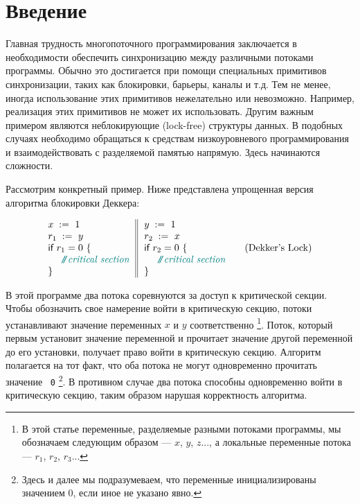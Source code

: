 \section{Введение}
\label{sec:intro}

Главная трудность многопоточного программирования 
заключается в необходимости обеспечить  
синхронизацию между различными потоками программы. 
Обычно это достигается при помощи специальных 
примитивов синхронизации, 
таких как блокировки, барьеры, каналы и т.д. 
Тем не менее, иногда использование этих примитивов 
 нежелательно или невозможно. 
Например, реализация этих 
примитивов не может их использовать. 
Другим важным примером являются  неблокирующие (lock-free) структуры данных.
В подобных случаях необходимо обращаться к средствам
низкоуровневого программирования и 
взаимодействовать с разделяемой памятью напрямую.
Здесь начинаются сложности. 

Рассмотрим конкретный пример.
Ниже представлена упрощенная версия 
алгоритма блокировки Деккера:

\begin{equation*}
\inarrII{
  \writeInst{}{x}{1} \\
  \readInst{}{r_1}{y}  \\
  \kw{if} {r_1 = 0} ~\{ \\
  ~~ \comment{critical section} \\
  \}
}{
  \writeInst{}{y}{1} \\
  \readInst{}{r_2}{x}  \\
  \kw{if} {r_2 = 0} ~\{ \\
  ~~ \comment{critical section} \\
  \}
}
\tag{Dekker's Lock}\label{ex:Dekker}
\end{equation*}

В этой программе два потока соревнуются за доступ к критической секции.
Чтобы обозначить свое намерение войти в критическую секцию,
потоки устанавливают значение переменных $x$ и $y$ соответственно%
\footnote{В этой статье  переменные,  разделяемые разными потоками программы, мы обозначаем следующим образом ---
 $x$, $y$, $z$..., а локальные  
 переменные  потока --- $r_1$, $r_2$, $r_3$...}.
Поток, который первым установит значение переменной и 
прочитает значение другой переменной до его установки,
получает право войти в критическую секцию.
Алгоритм полагается на тот факт, что оба 
потока не могут одновременно прочитать значение ~\texttt{0}%
\footnote{Здесь и далее  мы подразумеваем, 
что переменные инициализированы значением 0, если иное не указано явно.}.
В противном случае два потока способны одновременно 
войти в критическую секцию, таким образом нарушая корректность алгоритма. 

